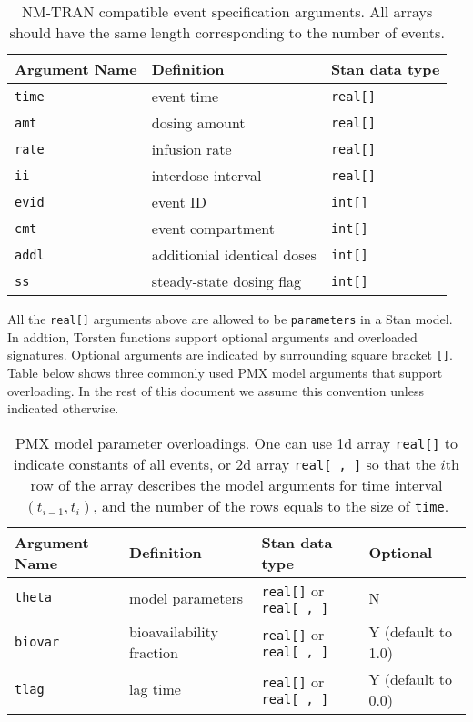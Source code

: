\documentclass[12pt, reqno, oneside]{amsbook}
\numberwithin{equation}{chapter}
\numberwithin{figure}{chapter}
\numberwithin{table}{chapter}
\theoremstyle{remark}
\begin{document}
\begin{table}[htbp]
\caption{\label{tab:event_args}NM-TRAN compatible event specification arguments. All arrays should have the same length corresponding to the number of events.}
\centering
\begin{tabular}{lll}
Argument Name & Definition & Stan data type\\
\hline
\texttt{time} & event time & \texttt{real[]}\\
\texttt{amt} & dosing amount & \texttt{real[]}\\
\texttt{rate} & infusion rate & \texttt{real[]}\\
\texttt{ii} & interdose interval & \texttt{real[]}\\
\texttt{evid} & event ID & \texttt{int[]}\\
\texttt{cmt} & event compartment & \texttt{int[]}\\
\texttt{addl} & additionial identical doses & \texttt{int[]}\\
\texttt{ss} & steady-state dosing flag & \texttt{int[]}\\
\hline
\end{tabular}
\end{table}
All the \texttt{real[]} arguments above are allowed to
be \texttt{parameters} in a Stan model.
In addtion, Torsten functions
support optional arguments and overloaded signatures.
Optional arguments are indicated by surrounding square bracket \texttt{[]}.
Table below shows three commonly used PMX model arguments that support
overloading. In the rest of this document we assume this convention unless indicated otherwise.

\begin{table}[htbp]
\caption{\label{tab:event_params}PMX model parameter overloadings. One can use 1d array \texttt{real[]} to indicate constants of all events, or 2d array \texttt{real[ , ]} so that the \(i\)th row of the array describes the model arguments for time interval \((t_{i-1}, t_i)\), and the number of the rows equals to the size of \texttt{time}.}
\centering
\begin{tabular}{llll}
Argument Name & Definition & Stan data type & Optional\\
\hline
\texttt{theta} & model parameters & \texttt{real[]} or \texttt{real[ , ]} & N\\
\texttt{biovar} & bioavailability fraction & \texttt{real[]} or \texttt{real[ , ]} & Y (default to 1.0)\\
\texttt{tlag} & lag time & \texttt{real[]} or \texttt{real[ , ]} & Y (default to 0.0)\\
\hline
\end{tabular}
\end{table}
\end{document}
